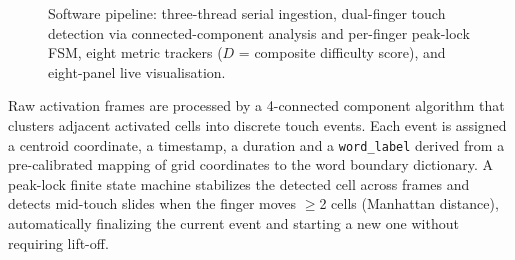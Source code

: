 \documentclass[conference]{IEEEtran}
\begin{document}
\begin{figure}[htbp]
{%
    }
    \caption{Software pipeline: three-thread serial ingestion, dual-finger
    touch detection via connected-component analysis and per-finger
    peak-lock FSM, eight metric trackers
    ($D$ = composite difficulty score), and eight-panel live visualisation.}
    \label{fig:sw_flow}
    \vspace{-6mm}
    \end{figure}


    Raw activation frames are processed by a 4-connected component
    algorithm that clusters adjacent activated cells into discrete touch
    events. Each event is assigned a centroid coordinate, a timestamp, a duration and a
    \texttt{word\_label} derived from a pre-calibrated mapping of grid
    coordinates to the word boundary dictionary. A peak-lock finite state
    machine stabilizes the detected cell across frames and detects
    mid-touch slides when the finger moves $\geq$2 cells (Manhattan
    distance), automatically finalizing the current event and starting a
    new one without requiring lift-off.

\end{document}
